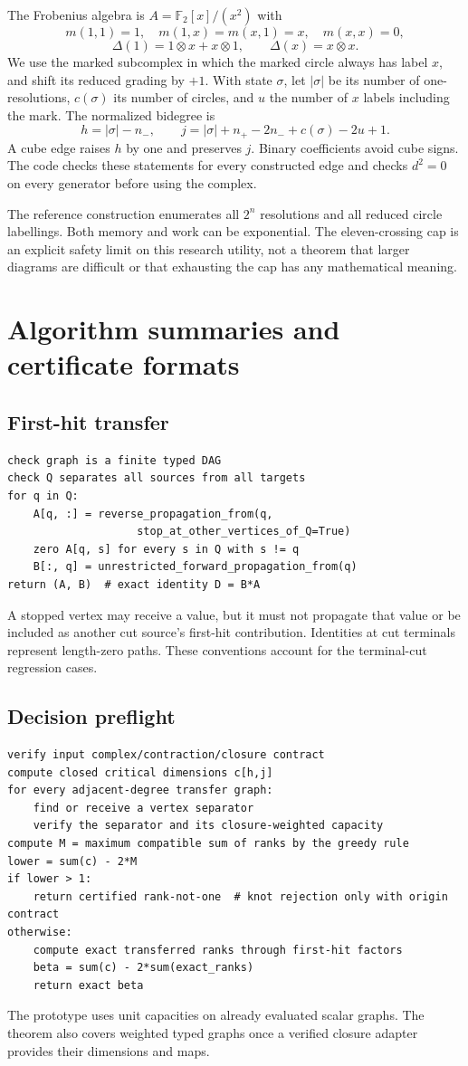 \documentclass[11pt,letterpaper]{article}
\theoremstyle{definition}\newtheorem{definition}[theorem]{Definition}
\theoremstyle{remark}\newtheorem{remark}[theorem]{Remark}
\newcommand{\F}{\mathbb F_2}
\begin{document}
The Frobenius algebra is $A=\F[x]/(x^2)$ with
\[
 m(1,1)=1,\quad m(1,x)=m(x,1)=x,\quad m(x,x)=0,
\]
\[
 \Delta(1)=1\otimes x+x\otimes1,\qquad\Delta(x)=x\otimes x.
\]
We use the marked subcomplex in which the marked circle always has label
$x$, and shift its reduced grading by $+1$. With state $\sigma$, let
$|\sigma|$ be its number of one-resolutions, $c(\sigma)$ its number of circles,
and $u$ the number of $x$ labels including the mark. The normalized bidegree is
\[
 h=|\sigma|-n_-,\qquad
 j=|\sigma|+n_+-2n_-+c(\sigma)-2u+1.
\]
A cube edge raises $h$ by one and preserves $j$. Binary coefficients avoid
cube signs. The code checks these statements for every constructed edge and
checks $d^2=0$ on every generator before using the complex.

The reference construction enumerates all $2^n$ resolutions and all reduced
circle labellings. Both memory and work can be exponential. The eleven-crossing
cap is an explicit safety limit on this research utility, not a theorem
that larger diagrams are difficult or that exhausting the cap has any
mathematical meaning.

\section{Algorithm summaries and certificate formats}
\subsection{First-hit transfer}
\begin{lstlisting}
check graph is a finite typed DAG
check Q separates all sources from all targets
for q in Q:
    A[q, :] = reverse_propagation_from(q,
                    stop_at_other_vertices_of_Q=True)
    zero A[q, s] for every s in Q with s != q
    B[:, q] = unrestricted_forward_propagation_from(q)
return (A, B)  # exact identity D = B*A
\end{lstlisting}
A stopped vertex may receive a value, but it must not propagate that value
or be included as another cut source's first-hit contribution. Identities
at cut terminals represent length-zero paths. These conventions account for
the terminal-cut regression cases.

\subsection{Decision preflight}
\begin{lstlisting}
verify input complex/contraction/closure contract
compute closed critical dimensions c[h,j]
for every adjacent-degree transfer graph:
    find or receive a vertex separator
    verify the separator and its closure-weighted capacity
compute M = maximum compatible sum of ranks by the greedy rule
lower = sum(c) - 2*M
if lower > 1:
    return certified rank-not-one  # knot rejection only with origin contract
otherwise:
    compute exact transferred ranks through first-hit factors
    beta = sum(c) - 2*sum(exact_ranks)
    return exact beta
\end{lstlisting}
The prototype uses unit capacities on already evaluated scalar graphs.
The theorem also covers weighted typed graphs once a verified closure
adapter provides their dimensions and maps.
\end{document}
